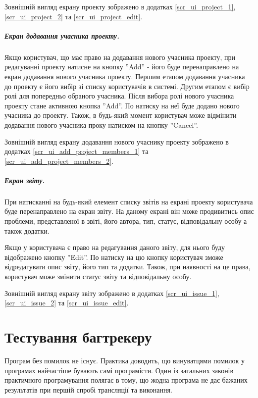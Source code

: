 \documentclass[../main.tex]{subfiles}
\begin{document}
			Зовнішній вигляд екрану проекту зображено в додатках \ref{scr_ui_project_1}, \ref{scr_ui_project_2} та \ref{scr_ui_project_edit}.
	
		\subparagraph{Екран додавання учасника проекту.}
		
			Якщо користувач, що має право на додавання нового учасника проекту, при редагуванні проекту натисне на кнопку ''Add'' - його буде перенаправлено на екран додавання нового учасника проекту. Першим етапом додавання учасника до проекту є його вибір зі списку користувачів в системі. Другим етапом є вибір ролі для попередньо обраного учасника. Після вибора ролі нового учасника проекту стане активною кнопка ''Add''. По натиску на неї буде додано нового учасника до проекту. Також, в будь-який момент користувач може відмінити додавання нового учасника проку натиском на кнопку ''Cancel''.
			
			Зовнішній вигляд екрану додавання нового учаснику проекту зображено в додатках \ref{scr_ui_add_project_members_1} та \ref{scr_ui_add_project_members_2}.
	
		\subparagraph{Екран звіту.}
		
			При натисканні на будь-який елемент списку звітів на екрані проекту користувача буде перенаправлено на екран звіту. На даному екрані він може продивитись опис проблеми, представленої в звіті, його автора, тип, статус, відповідальну особу а також додатки.
			
			Якщо у користувача є право на редагування даного звіту, для нього буду відображено кнопку ''Edit''. По натиску на цю кнопку користувач зможе відредагувати опис звіту, його тип та додатки. Також, при наявності на це права, користувач може змінити статус звіту та відповідальну особу.
			
			Зовнішній вигляд екрану звіту зображено в додатках \ref{scr_ui_issue_1}, \ref{scr_ui_issue_2} та \ref{scr_ui_issue_edit}.


\section{Тестування багтрекеру}

	Програм без помилок не існує. Практика доводить, що винуватцями помилок у програмах найчастіше бувають самі програмісти. Один із загальних законів практичного програмування полягає в тому, що жодна програма не дає бажаних результатів при першій спробі трансляції та виконання.~\cite{fast_testing}
	
\end{document}
